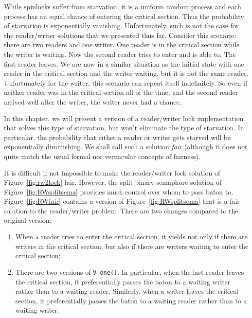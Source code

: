 \documentclass{report}
\begin{document}
While spinlocks suffer from starvation, it is a uniform random
process and each process has an equal chance of entering the critical
section.  Thus the probability of starvation is exponentially vanishing.
Unfortunately, such is not the case for the
reader/writer solutions that we presented thus far.
Consider this scenario: there are two readers and one writer.  One reader
is in the critical section while the writer is waiting.  Now the
second reader tries to enter and is able to.  The first reader leaves.
We are now in a similar situation as the initial state with one reader
in the critical section and the writer waiting, but it is not the same
reader.  Unfortunately for the writer, this scenario can repeat itself
indefinitely.  So even if neither reader was in the critical section
all of the time, and the second reader arrived well after the writer,
the writer never had a chance.

In this chapter, we will present a version of a reader/writer lock
implementation that solves this type of starvation, but won't eliminate
the type of starvation.
In particular, the probability that either a reader or writer gets starved
will be exponentially diminishing.
We shall call such a solution \emph{fair} (although it does not quite
match the usual formal nor vernacular concepts of fairness).

It is difficult if not impossible to make the reader/writer lock solution of
Figure~\ref{fig:rw2lock} fair.  However, the split binary semaphore solution of
Figure~\ref{fig:RWsplitsema} provides much control over whom to pass baton
to.
Figure~\ref{fig:RWfair} contains a version of Figure~\ref{fig:RWsplitsema}
that is a fair solution to the reader/writer problem.  There are two changes
compared to the original version:

\begin{enumerate}
\item When a reader tries to enter the critical section, it yields not only
if there are writers in the critical section, but also if there are writers
waiting to enter the critical section;
\item There are two versions of \texttt{V\_one()}.  In particular, when the
last reader leaves the critical section, it preferentially passes the baton
to a waiting writer rather than to a waiting reader.  Similarly,
when a writer leaves the critical section, it preferentially passes
the baton to a waiting reader rather than to a waiting writer.
\end{enumerate}
\end{document}
